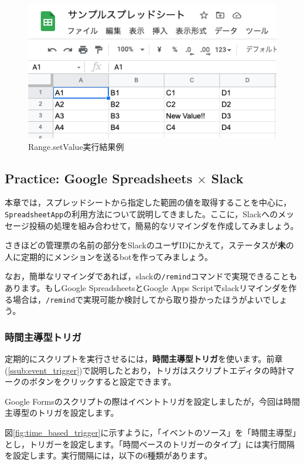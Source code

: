 \documentclass[uplatex,a4j]{jsarticle}
\begin{document}
\begin{figure}[H]
 \centering
 \includegraphics[keepaspectratio, scale=0.7]{images/setvalue_result.png}
 \caption{Range.setValue実行結果例}
 \label{fig:setvalue_result}
\end{figure}
  
\subsection{Practice: Google Spreadsheets $\times$ Slack}

本章では，スプレッドシートから指定した範囲の値を取得することを中心に，\verb|SpreadsheetApp|の利用方法について説明してきました。ここに，Slackへのメッセージ投稿の処理を組み合わせて，簡易的なリマインダを作成してみましょう。

さきほどの管理票の名前の部分をSlackのユーザIDにかえて，ステータスが\textbf{未}の人に定期的にメンションを送るbotを作ってみましょう。

なお，簡単なリマインダであれば，slackの\verb|/remind|コマンドで実現できることもあります。もしGoogle SpreadsheetsとGoogle Apps Scriptでslackリマインダを作る場合は，\verb|/remind|で実現可能か検討してから取り掛かったほうがよいでしょう。

\subsubsection{時間主導型トリガ}

定期的にスクリプトを実行させるには，\textbf{時間主導型トリガ}を使います。前章(\ref{ssub:event_trigger})で説明したとおり，トリガはスクリプトエディタの時計マークのボタンをクリックすると設定できます。

Google Formsのスクリプトの際はイベントトリガを設定しましたが，今回は時間主導型のトリガを設定します。


図\ref{fig:time_based_trigger}に示すように，「イベントのソース」を「時間主導型」とし，トリガーを設定します。「時間ベースのトリガーのタイプ」には実行間隔を設定します。実行間隔には，以下の6種類があります。
\end{document}
